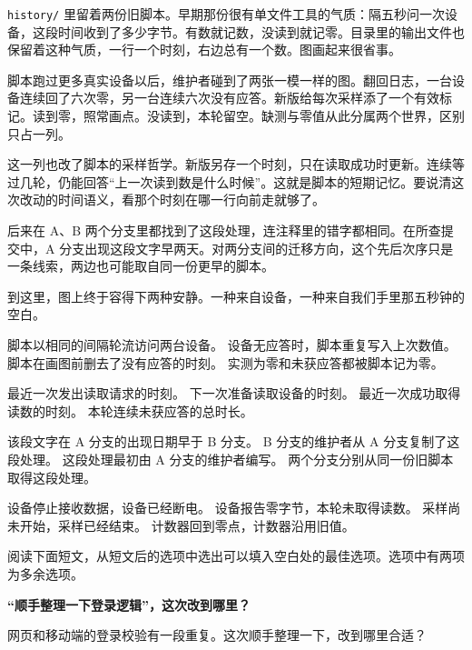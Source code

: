 \documentclass[UTF8, zihao=5, a4paper, fontset=fandol]{ctexart}
\begin{document}
\smallskip
\noindent\arole\texttt{history/} 里留着两份旧脚本。早期那份很有单文件工具的气质：隔五秒问一次设备，这段时间收到了多少字节。有数就记数，没读到就记零。目录里的输出文件也保留着这种气质，一行一个时刻，右边总有一个数。图画起来很省事。

脚本跑过更多真实设备以后，维护者碰到了两张一模一样的图。翻回日志，一台设备连续回了六次零，另一台连续六次没有应答。新版给每次采样添了一个有效标记。读到零，照常画点。没读到，本轮留空。缺测与零值从此分属两个世界，区别只占一列。

这一列也改了脚本的采样哲学。新版另存一个时刻，只在读取成功时更新。连续等过几轮，仍能回答“上一次读到数是什么时候”。这就是脚本的短期记忆。要说清这次改动的时间语义，看那个时刻在哪一行向前走就够了。

后来在 A、B 两个分支里都找到了这段处理，连注释里的错字都相同。在所查提交中，A 分支出现这段文字早两天。对两分支间的迁移方向，这个先后次序只是一条线索，两边也可能取自同一份更早的脚本。

到这里，图上终于容得下两种安静。一种来自设备，一种来自我们手里那五秒钟的空白。

\fourchoices
  {脚本以相同的间隔轮流访问两台设备。}
  {设备无应答时，脚本重复写入上次数值。}
  {脚本在画图前删去了没有应答的时刻。}
  {实测为零和未获应答都被脚本记为零。}

\fourchoices
  {最近一次发出读取请求的时刻。}
  {下一次准备读取设备的时刻。}
  {最近一次成功取得读数的时刻。}
  {本轮连续未获应答的总时长。}

\fourchoices
  {该段文字在 A 分支的出现日期早于 B 分支。}
  {B 分支的维护者从 A 分支复制了这段处理。}
  {这段处理最初由 A 分支的维护者编写。}
  {两个分支分别从同一份旧脚本取得这段处理。}

\fourchoices
  {设备停止接收数据，设备已经断电。}
  {设备报告零字节，本轮未取得读数。}
  {采样尚未开始，采样已经结束。}
  {计数器回到零点，计数器沿用旧值。}


阅读下面短文，从短文后的选项中选出可以填入空白处的最佳选项。选项中有两项为多余选项。

\begin{center}
{\heiti\bfseries “顺手整理一下登录逻辑”，这次改到哪里？}
\end{center}

\noindent\urole 网页和移动端的登录校验有一段重复。这次顺手整理一下，改到哪里合适？
\end{document}
